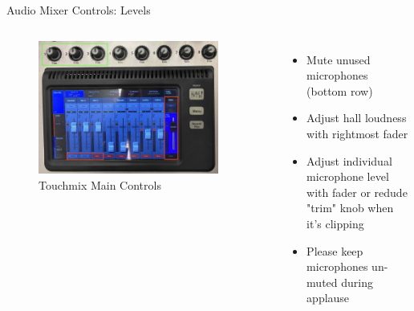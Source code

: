 
\begin{frame}{Audio Mixer Controls: Levels}
	\begin{columns}[T,onlytextwidth]
		\begin{figure} 
			\centering
			\includegraphics[width=0.9\textwidth]{images/touchmix-main-controls.jpg}
			\caption{Touchmix Main Controls}
		\end{figure}
		\begin{itemize}
			\item Mute unused microphones (bottom row)
			\item Adjust hall loudness with rightmost fader
			\item Adjust individual microphone level with fader or redude "trim" knob when it's clipping
			\item Please keep microphones un-muted during applause
		\end{itemize}
	\end{columns}
\end{frame}

